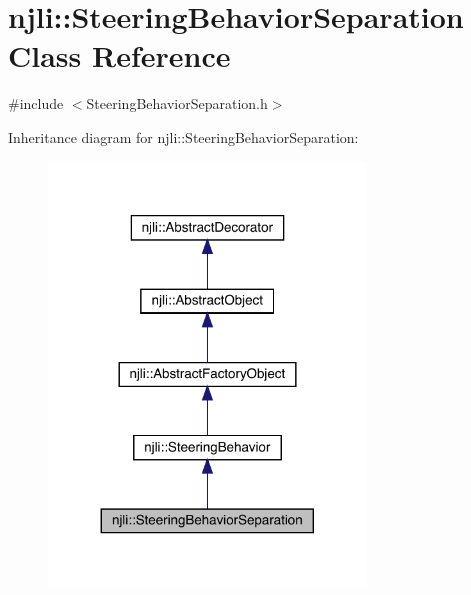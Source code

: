 \hypertarget{classnjli_1_1_steering_behavior_separation}{}\section{njli\+:\+:Steering\+Behavior\+Separation Class Reference}
\label{classnjli_1_1_steering_behavior_separation}


{\ttfamily \#include $<$Steering\+Behavior\+Separation.\+h$>$}



Inheritance diagram for njli\+:\+:Steering\+Behavior\+Separation\+:\nopagebreak
\begin{figure}[H]
\begin{center}
\leavevmode
\includegraphics[width=239pt]{classnjli_1_1_steering_behavior_separation__inherit__graph}
\end{center}
\end{figure}


